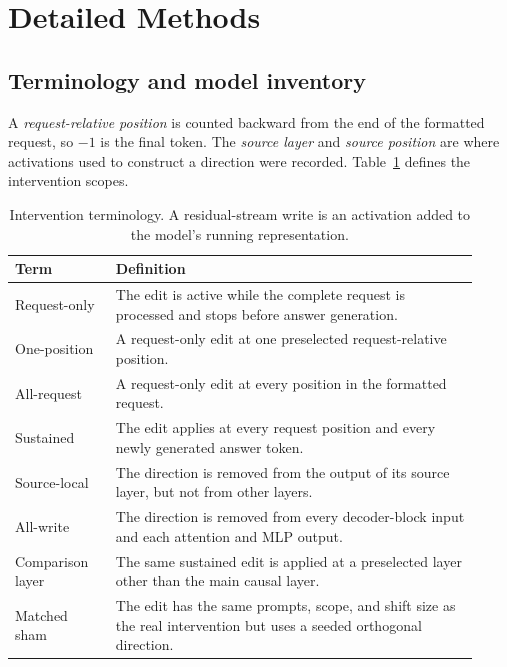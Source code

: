 \documentclass{article}
\begin{document}



\appendix

\section{Detailed Methods}
\label{app:detailed-methods}

\subsection{Terminology and model inventory}

A \emph{request-relative position} is counted backward from the end of the formatted request, so $-1$ is the final token. The \emph{source layer} and \emph{source position} are where activations used to construct a direction were recorded. Table~\ref{tab:scope-terms} defines the intervention scopes.

\begin{table}[h]
  \centering
  \caption{Intervention terminology. A residual-stream write is an activation added to the model's running representation.}
  \label{tab:scope-terms}
  \small
  \begin{tabular}{p{0.20\linewidth}p{0.72\linewidth}}
    \toprule
    Term & Definition \\
    \midrule
    Request-only & The edit is active while the complete request is processed and stops before answer generation. \\
    One-position & A request-only edit at one preselected request-relative position. \\
    All-request & A request-only edit at every position in the formatted request. \\
    Sustained & The edit applies at every request position and every newly generated answer token. \\
    Source-local & The direction is removed from the output of its source layer, but not from other layers. \\
    All-write & The direction is removed from every decoder-block input and each attention and MLP output. \\
    Comparison layer & The same sustained edit is applied at a preselected layer other than the main causal layer. \\
    Matched sham & The edit has the same prompts, scope, and shift size as the real intervention but uses a seeded orthogonal direction. \\
    \bottomrule
  \end{tabular}
\end{table}
\end{document}

